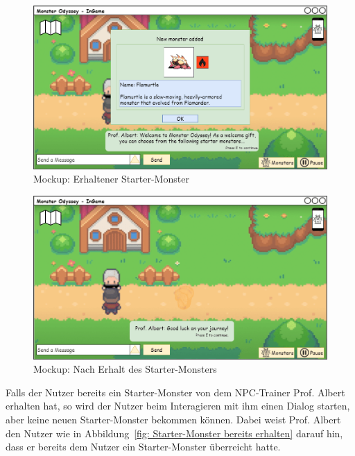 \begin{figure}[H]
    \center
    \includegraphics[scale=\scale]{images/mockups/Starter/PlayerAndProfMonsterReceived}
    \caption{Mockup: Erhaltener Starter-Monster}
    \label{fig: Erhaltener Starter-Monster}
\end{figure}
\begin{figure}[H]
    \center
    \includegraphics[scale=\scale]{images/mockups/Starter/PlayerAndProfAfterReceived}
    \caption{Mockup: Nach Erhalt des Starter-Monsters}
    \label{fig: Nach Erhalt des Starter-Monsters}
\end{figure}
Falls der Nutzer bereits ein Starter-Monster von dem NPC-Trainer Prof. Albert erhalten hat, so wird der Nutzer beim Interagieren mit ihm einen Dialog starten, aber keine neuen Starter-Monster bekommen können. Dabei weist Prof. Albert den Nutzer wie in Abbildung~\ref{fig: Starter-Monster bereits erhalten} darauf hin, dass er bereits dem Nutzer ein Starter-Monster überreicht hatte.
